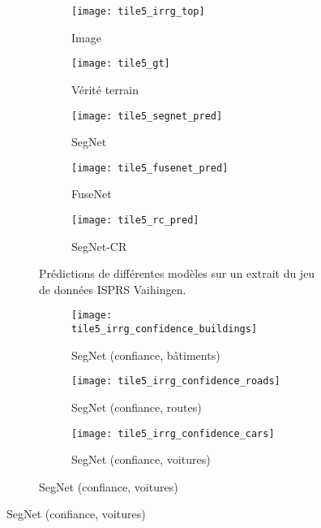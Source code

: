 \begin{figure}[!tb]
	\begin{subfigure}{\textwidth}
    	\captionsetup[subfigure]{singlelinecheck=off,justification=centering}
  		\captionsetup[subfigure]{labelformat=empty}
    	\begin{subfigure}{0.19\textwidth}
        	\texttt{[image: tile5\_irrg\_top]}
      		\caption*{Image }
        \end{subfigure}
        \begin{subfigure}{0.19\textwidth}
        	\texttt{[image: tile5\_gt]}
        	\caption*{Vérité terrain}
        \end{subfigure}
        \begin{subfigure}{0.19\textwidth}
        	\texttt{[image: tile5\_segnet\_pred]}
        	\caption*{SegNet}
        \end{subfigure}
        \begin{subfigure}{0.19\textwidth}
        	\texttt{[image: tile5\_fusenet\_pred]}
        	\caption*{FuseNet}
        \end{subfigure}
        \begin{subfigure}{0.19\textwidth}
        	\texttt{[image: tile5\_rc\_pred]}
        	\caption*{SegNet-CR}
        \end{subfigure}
        \caption{Prédictions de différentes modèles sur un extrait du jeu de données \gls{ISPRS} Vaihingen.}
        \label{fig:fusion_exemple1}
    \end{subfigure}
    	\begin{subfigure}{\textwidth}
    	\captionsetup[subfigure]{singlelinecheck=off,justification=centering}
  		\captionsetup[subfigure]{labelformat=empty}
    	\begin{subfigure}{0.19\textwidth}
        	\texttt{[image: tile5\_irrg\_confidence\_buildings]}
      		\caption*{SegNet  (confiance, bâtiments)}
        \end{subfigure}
        \begin{subfigure}{0.19\textwidth}
        	\texttt{[image: tile5\_irrg\_confidence\_roads]}
        	\caption*{SegNet  (confiance, routes)}
        \end{subfigure}
        \begin{subfigure}{0.19\textwidth}
        	\texttt{[image: tile5\_irrg\_confidence\_cars]}
        	\caption*{SegNet  (confiance, voitures)}

\end{subfigure}
\end{subfigure}
\end{figure}
